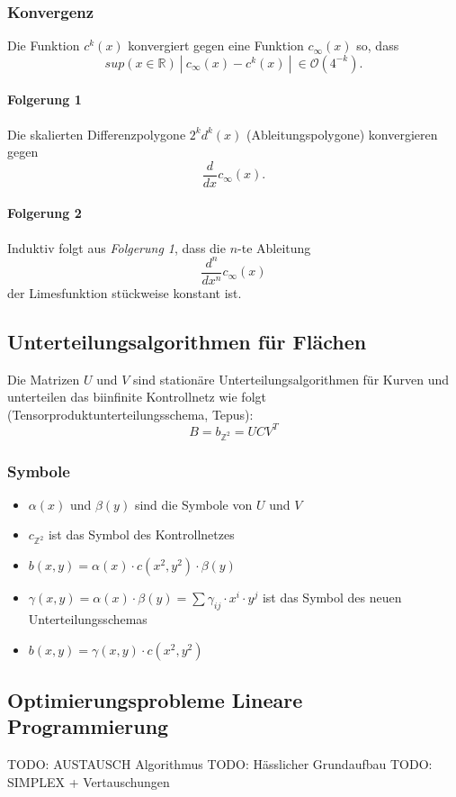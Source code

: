 \subsubsection{Konvergenz}
Die Funktion \(c^k(x)\) konvergiert gegen eine Funktion \(c_{\infty}(x)\) so, dass
\[sup(x \in \mathbb{R})~|~c_{\infty}(x) - c^k(x)~|~\in \mathcal{O}(4^{-k}).\]

\paragraph{Folgerung 1}
Die skalierten Differenzpolygone \(2^k d^k(x)\) (Ableitungspolygone) konvergieren gegen
\[\frac{d}{dx} c_{\infty}(x).\]

\paragraph{Folgerung 2}
Induktiv folgt aus \textit{Folgerung 1}, dass die \(n\)-te Ableitung
\[\frac{d^n}{dx^n} c_{\infty}(x)\]
der Limesfunktion stückweise konstant ist.


\subsection{Unterteilungsalgorithmen für Flächen}
Die Matrizen \(U\) und \(V\) sind stationäre Unterteilungsalgorithmen für Kurven und unterteilen das biinfinite Kontrollnetz wie folgt (Tensorproduktunterteilungsschema, Tepus):
\[B = b_{\mathbb{Z}^2} = UCV^T\]

\subsubsection{Symbole}
\begin{itemize}
	\item \(\alpha(x)\) und \(\beta(y)\) sind die Symbole von \(U\) und \(V\)
	\item \(c_{\mathbb{Z}^2}\) ist das Symbol des Kontrollnetzes
	\item \(b(x,y) = \alpha(x) \cdot c(x^2,y^2) \cdot \beta(y)\)
	\item \(\gamma(x,y) = \alpha(x) \cdot \beta(y) = \sum \gamma_{ij} \cdot x^i \cdot y^j\) ist das Symbol des neuen Unterteilungsschemas
	\item \(b(x,y) = \gamma(x,y) \cdot c(x^2,y^2)\)
\end{itemize}


\subsection{Optimierungsprobleme Lineare Programmierung}

TODO: AUSTAUSCH Algorithmus
TODO: Hässlicher Grundaufbau
TODO: SIMPLEX + Vertauschungen
